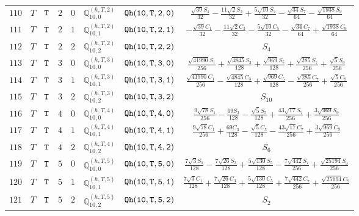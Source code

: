\documentclass[fleqn,8pt]{jsarticle}
\begin{document}
\begin{table}[ht!]
\begin{center}
\begin{tabular}{cccccccc}
$ 110 $ & $ T $ & $ {\tt T} $ & $ 2 $ & $ 0 $ & $ \mathbb{Q}_{10,0}^{(h,T,2)} $ & $ {\tt Qh(10,T,2,0)} $ & $ \frac{\sqrt{39} S_{1}}{32} - \frac{11 \sqrt{2} S_{3}}{32} + \frac{5 \sqrt{10} S_{5}}{32} - \frac{\sqrt{34} S_{7}}{64} - \frac{\sqrt{1938} S_{9}}{64} $ \\
$ 111 $ & $ T $ & $ {\tt T} $ & $ 2 $ & $ 1 $ & $ \mathbb{Q}_{10,1}^{(h,T,2)} $ & $ {\tt Qh(10,T,2,1)} $ & $ - \frac{\sqrt{39} C_{1}}{32} - \frac{11 \sqrt{2} C_{3}}{32} - \frac{5 \sqrt{10} C_{5}}{32} - \frac{\sqrt{34} C_{7}}{64} + \frac{\sqrt{1938} C_{9}}{64} $ \\
$ 112 $ & $ T $ & $ {\tt T} $ & $ 2 $ & $ 2 $ & $ \mathbb{Q}_{10,2}^{(h,T,2)} $ & $ {\tt Qh(10,T,2,2)} $ & $ S_{4} $ \\
$ 113 $ & $ T $ & $ {\tt T} $ & $ 3 $ & $ 0 $ & $ \mathbb{Q}_{10,0}^{(h,T,3)} $ & $ {\tt Qh(10,T,3,0)} $ & $ \frac{\sqrt{41990} S_{1}}{256} + \frac{\sqrt{4845} S_{3}}{128} + \frac{\sqrt{969} S_{5}}{128} + \frac{\sqrt{285} S_{7}}{256} + \frac{\sqrt{5} S_{9}}{256} $ \\
$ 114 $ & $ T $ & $ {\tt T} $ & $ 3 $ & $ 1 $ & $ \mathbb{Q}_{10,1}^{(h,T,3)} $ & $ {\tt Qh(10,T,3,1)} $ & $ \frac{\sqrt{41990} C_{1}}{256} - \frac{\sqrt{4845} C_{3}}{128} + \frac{\sqrt{969} C_{5}}{128} - \frac{\sqrt{285} C_{7}}{256} + \frac{\sqrt{5} C_{9}}{256} $ \\
$ 115 $ & $ T $ & $ {\tt T} $ & $ 3 $ & $ 2 $ & $ \mathbb{Q}_{10,2}^{(h,T,3)} $ & $ {\tt Qh(10,T,3,2)} $ & $ S_{10} $ \\
$ 116 $ & $ T $ & $ {\tt T} $ & $ 4 $ & $ 0 $ & $ \mathbb{Q}_{10,0}^{(h,T,4)} $ & $ {\tt Qh(10,T,4,0)} $ & $ \frac{9 \sqrt{78} S_{1}}{256} - \frac{69 S_{3}}{128} - \frac{\sqrt{5} S_{5}}{128} + \frac{43 \sqrt{17} S_{7}}{256} + \frac{3 \sqrt{969} S_{9}}{256} $ \\
$ 117 $ & $ T $ & $ {\tt T} $ & $ 4 $ & $ 1 $ & $ \mathbb{Q}_{10,1}^{(h,T,4)} $ & $ {\tt Qh(10,T,4,1)} $ & $ \frac{9 \sqrt{78} C_{1}}{256} + \frac{69 C_{3}}{128} - \frac{\sqrt{5} C_{5}}{128} - \frac{43 \sqrt{17} C_{7}}{256} + \frac{3 \sqrt{969} C_{9}}{256} $ \\
$ 118 $ & $ T $ & $ {\tt T} $ & $ 4 $ & $ 2 $ & $ \mathbb{Q}_{10,2}^{(h,T,4)} $ & $ {\tt Qh(10,T,4,2)} $ & $ S_{6} $ \\
$ 119 $ & $ T $ & $ {\tt T} $ & $ 5 $ & $ 0 $ & $ \mathbb{Q}_{10,0}^{(h,T,5)} $ & $ {\tt Qh(10,T,5,0)} $ & $ \frac{7 \sqrt{3} S_{1}}{128} - \frac{7 \sqrt{26} S_{3}}{128} + \frac{5 \sqrt{130} S_{5}}{128} - \frac{7 \sqrt{442} S_{7}}{256} + \frac{\sqrt{25194} S_{9}}{256} $ \\
$ 120 $ & $ T $ & $ {\tt T} $ & $ 5 $ & $ 1 $ & $ \mathbb{Q}_{10,1}^{(h,T,5)} $ & $ {\tt Qh(10,T,5,1)} $ & $ \frac{7 \sqrt{3} C_{1}}{128} + \frac{7 \sqrt{26} C_{3}}{128} + \frac{5 \sqrt{130} C_{5}}{128} + \frac{7 \sqrt{442} C_{7}}{256} + \frac{\sqrt{25194} C_{9}}{256} $ \\
$ 121 $ & $ T $ & $ {\tt T} $ & $ 5 $ & $ 2 $ & $ \mathbb{Q}_{10,2}^{(h,T,5)} $ & $ {\tt Qh(10,T,5,2)} $ & $ S_{2} $ \\
 \hline \hline
\end{tabular}
\end{center}
\end{table}
\end{document}

